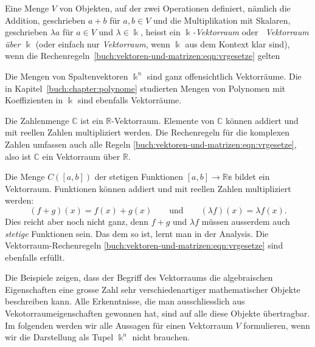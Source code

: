 \begin{definition}
Eine Menge $V$ von Objekten, auf der zwei Operationen definiert,
nämlich die Addition, geschrieben $a+b$ für $a,b\in V$ und die
Multiplikation mit Skalaren, geschrieben $\lambda a$ für $a\in V$ und 
$\lambda\in \Bbbk$, heisst ein {\em $\Bbbk$-Vektorraum} oder {\em Vektorraum
über $\Bbbk$} (oder
einfach nur {\em Vektorraum}, wenn $\Bbbk$ aus dem Kontext klar sind),
wenn die Rechenregeln~\eqref{buch:vektoren-und-matrizen:eqn:vrgesetze}
gelten
\end{definition}

Die Mengen von Spaltenvektoren $\Bbbk^n$ sind ganz offensichtlich
Vektorräume.
Die in Kapitel~\ref{buch:chapter:polynome} studierten Mengen von
Polynomen mit Koeffizienten in $\Bbbk$ sind ebenfalls Vektorräume.

\begin{beispiel}
Die Zahlenmenge $\mathbb{C}$ ist ein $\mathbb{R}$-Vektorraum.
Elemente von $\mathbb{C}$ können addiert und mit reellen Zahlen
multipliziert werden.
Die Rechenregeln für die komplexen Zahlen umfassen auch alle Regeln
\eqref{buch:vektoren-und-matrizen:eqn:vrgesetze}, also ist
$\mathbb{C}$ ein Vektorraum über $\mathbb{R}$.
\end{beispiel}

\begin{beispiel}
Die Menge $C([a,b])$ der stetigen Funktionen $[a,b]\to\mathbb{Re}$ 
bildet ein Vektorraum.
Funktionen können addiert und mit reellen Zahlen multipliziert werden:
\[
(f+g)(x) = f(x) + g(x)
\qquad\text{und}\qquad
(\lambda f)(x) = \lambda f(x).
\]
Dies reicht aber noch nicht ganz, denn $f+g$ und $\lambda f$ müssen
ausserdem auch {\em stetige} Funktionen sein.
Das dem so ist, lernt man in der Analysis.
Die Vektorraum-Rechenregeln
\eqref{buch:vektoren-und-matrizen:eqn:vrgesetze} sind ebenfalls erfüllt.
\end{beispiel}

Die Beispiele zeigen, dass der Begriff des Vektorraums die algebraischen
Eigenschaften eine grosse Zahl sehr verschiedenartiger mathematischer 
Objekte beschreiben kann.
Alle Erkenntnisse, die man ausschliesslich aus Vekotorraumeigenschaften
gewonnen hat, sind auf alle diese Objekte übertragbar.
Im folgenden werden wir alle Aussagen für einen Vektorraum $V$ formulieren,
wenn wir die Darstellung als Tupel $\Bbbk^n$ nicht brauchen.

